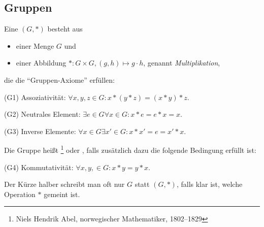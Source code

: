 
\subsection{Gruppen}\label{sec:groups}

\begin{definition}[Gruppen]
    \label{gruppen:def}
    Eine  $(G,*)$ besteht aus
    \begin{itemize}
        \item einer Menge $G$ und
        \item einer Abbildung $*: G\times G, (g,h) \mapsto g\cdot h$, genannt \emph{Multiplikation},
    \end{itemize}
    die die \enquote{Gruppen-Axiome} erfüllen:

    \begin{description}
        \item{(G1)} Assoziativität: $\forall x,y,z\in G: x\ast (y\ast z)=(x\ast y)\ast z$.
        \item{(G2)} Neutrales Element: $\exists e \in G \forall x\in G: x\ast e=e\ast x=x$.
        \item{(G3)} Inverse Elemente: $\forall x \in G \exists x' \in G: x\ast x' = e = x'\ast x$.
    \end{description}
    Die Gruppe heißt \footnote{Niels Hendrik Abel, norwegischer Mathematiker, 1802--1829} oder , falls zusätzlich dazu die folgende Bedingung erfüllt ist:
    \begin{description}
        \item{(G4)} Kommutativität: $\forall x,y,\in G: x\ast y=y\ast x$.
    \end{description}

    Der Kürze halber schreibt man oft nur $G$ statt $(G,\ast)$, falls klar ist, welche Operation $\ast$ gemeint ist.
\end{definition}

